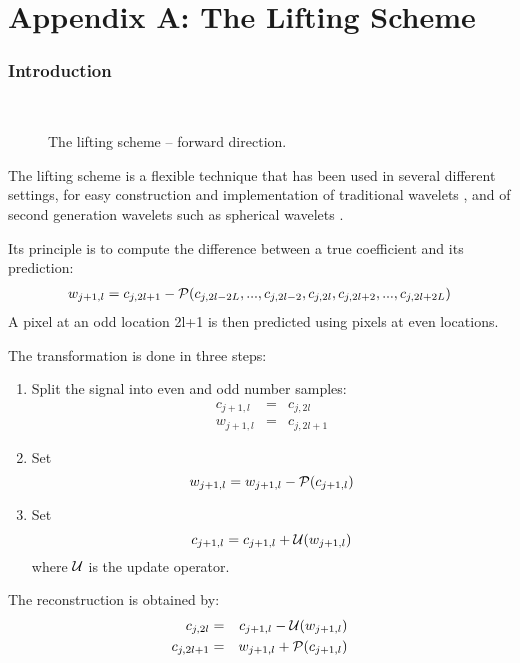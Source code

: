 \chapter*{Appendix A: The Lifting Scheme}

\subsection*{Introduction}

\begin{figure}[htb]
\centerline{
\hbox{
}
}
\caption{The lifting scheme -- forward direction.}
\label{fig_lift}
\end{figure}
The lifting scheme \cite{wave:sweldens96} is a flexible technique that has 
been used in several different settings, for easy construction and implementation
of traditional wavelets \cite{wave:sweldens96}, and of second generation
wavelets \cite{wave:sweldens95b} such as spherical wavelets \cite{wave:sweldens95a}.

Its principle is to compute the difference between a true coefficient and its
prediction:
\begin{eqnarray}
w_{j+1,l} = c_{j,2l+1} - {\cal P}(c_{j,2l-2L}, ..., c_{j,2l-2},c_{j,2l},c_{j,2l+2}, ..., c_{j,2l+2L})
\end{eqnarray}
A pixel at an odd location 2l+1 is then predicted using pixels at even
locations.

The transformation is done in three steps:
\begin{enumerate}
\item Split the signal into even and odd number samples:
\begin{eqnarray*}
c_{j+1,l} & = & c_{j,2l} \\
w_{j+1,l} & = & c_{j,2l+1}
\end{eqnarray*}
\item Set \[w_{j+1,l} = w_{j+1,l} - {\cal P}(c_{j+1,l})\]
\item Set \[c_{j+1,l} = c_{j+1,l} + {\cal U}(w_{j+1,l})\]
where $\cal U$ is the update operator.
\end{enumerate}
The reconstruction is obtained by:
\begin{eqnarray*}
c_{j,2l} & = & c_{j+1,l} - {\cal U}(w_{j+1,l}) \\
c_{j,2l+1} & = & w_{j+1,l} + {\cal P}(c_{j+1,l}) \\
\end{eqnarray*}
 
